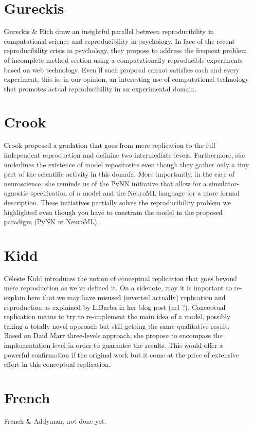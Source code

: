 \documentclass[jou]{apa6}
\begin{document}
\section{Gureckis}
Gureckis \& Rich draw an insightful parallel between reproducibility in
computational science and reproducibility in psychology. In face of the recent
reproducibility crisis in psychology, they propose to address the frequent
problem of incomplete method section using a computationally reproducible
experiments based on web technology. Even if such proposal cannot satisfies
each and every experiment, this is, in our opinion, an interesting use of
computational technology that promotes actual reproducibility in an
experimental domain.

\section{Crook}
Crook proposed a gradation that goes from mere replication to the full
independent reproduction and definine two intermediate levels. Furthermore, she
underlines the existence of model repositories even though they gather only a
tiny part of the scientific activity in this domain. More importantly, in the
case of neuroscience, she reminds us of the PyNN initiative that allow for a
simulator-agnostic specification of a model and the NeuroML language for a more
formal description. These initiatives partially solves the reproducibility
problem we highlighted even though you have to constrain the model in the
proposed paradigm (PyNN or NeuroML).

\section{Kidd}
Celeste Kidd introduces the notion of conceptual replication that goes beyond
mere reproduction as we've defined it. On a sidenote, may it is important to
re-explain here that we may have misused (inverted actually) replication and
reproduction as explained by L.Barba in her blog post (url ?). Conceptual
replication means to try to re-implement the main idea of a model, possibly
taking a totally novel approach but still getting the same qualitative
result. Based on Daid Marr three-levels approach, she propose to encompass the
implementation level in order to guarantee the results. This would offer a
powerful confirmation if the original work but it come at the price of
extensive effort in this conceptual replication.

\section{French}
French \& Addyman, not done yet.




\hspace*{1cm}
\end{document}
